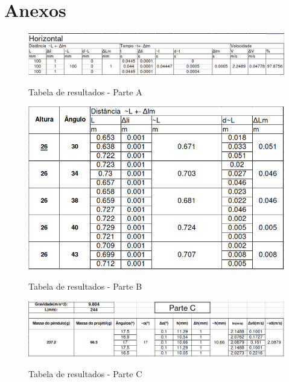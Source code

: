 \chapter*{Anexos}
\label{chap:anexos}
{
    \begin{figure}[H]
        \centering
        \includegraphics[width=1\textwidth]{images/tabela-parte1}\label{fig:tabela-parte1}
        \caption{Tabela de resultados - Parte A}
    \end{figure}

    \begin{figure}
        \centering
        \includegraphics[width=1\textwidth]{images/tabela-parte2}\label{fig:tabela-parte2}
        \caption{Tabela de resultados - Parte B}
    \end{figure}

    \begin{figure}
        \centering
        \includegraphics[width=1\textwidth]{images/tabela-parte3}\label{fig:tabela-parte3}
        \caption{Tabela de resultados - Parte C}
    \end{figure}
}
